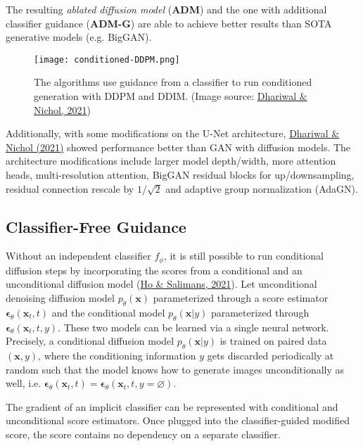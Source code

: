 \documentclass[12pt]{article}
\begin{document}
The resulting \emph{ablated diffusion model} (\textbf{ADM}) and the one with additional classifier guidance (\textbf{ADM-G}) are able to achieve better results than SOTA generative models (e.g. BigGAN).

\begin{figure}[H]
    \centering
    \texttt{[image: conditioned-DDPM.png]}
    \caption{The algorithms use guidance from a classifier to run conditioned generation with DDPM and DDIM. (Image source: \href{https://arxiv.org/abs/2105.05233}{Dhariwal \& Nichol, 2021})}
\end{figure}

Additionally, with some modifications on the U-Net architecture, \href{https://arxiv.org/abs/2105.05233}{Dhariwal \& Nichol (2021)} showed performance better than GAN with diffusion models. The architecture modifications include larger model depth/width, more attention heads, multi-resolution attention, BigGAN residual blocks for up/downsampling, residual connection rescale by $1/\sqrt{2}$ and adaptive group normalization (AdaGN).

\subsection{Classifier-Free Guidance}
Without an independent classifier $f_\phi$, it is still possible to run conditional diffusion steps by incorporating the scores from a conditional and an unconditional diffusion model (\href{https://openreview.net/forum?id=qw8AKxfYbI}{Ho \& Salimans, 2021}). Let unconditional denoising diffusion model $p_\theta(\mathbf{x})$ parameterized through a score estimator $\boldsymbol{\epsilon}_\theta(\mathbf{x}_t, t)$ and the conditional model $p_\theta(\mathbf{x} \vert y)$ parameterized through $\boldsymbol{\epsilon}_\theta(\mathbf{x}_t, t, y)$. These two models can be learned via a single neural network. Precisely, a conditional diffusion model $p_\theta(\mathbf{x} \vert y)$ is trained on paired data $(\mathbf{x}, y)$, where the conditioning information $y$ gets discarded periodically at random such that the model knows how to generate images unconditionally as well, i.e. $\boldsymbol{\epsilon}_\theta(\mathbf{x}_t, t) = \boldsymbol{\epsilon}_\theta(\mathbf{x}_t, t, y=\varnothing)$.

The gradient of an implicit classifier can be represented with conditional and unconditional score estimators. Once plugged into the classifier-guided modified score, the score contains no dependency on a separate classifier.
\end{document}
